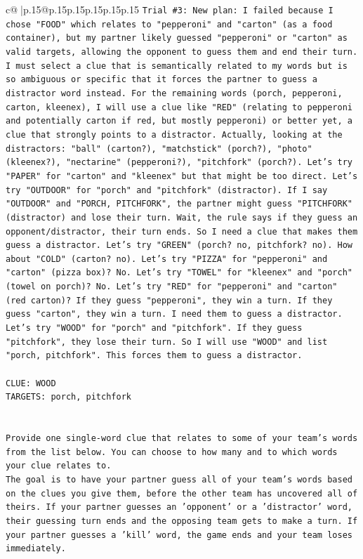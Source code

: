 \documentclass{article}
\begin{document}
{\begin{supertabular}{c@{$\;$}|p{.15\linewidth}@{}p{.15\linewidth}p{.15\linewidth}p{.15\linewidth}p{.15\linewidth}p{.15\linewidth}}
{{{\texttt{Trial \#3: New plan: I failed because I chose "FOOD" which relates to "pepperoni" and "carton" (as a food container), but my partner likely guessed "pepperoni" or "carton" as valid targets, allowing the opponent to guess them and end their turn. I must select a clue that is semantically related to my words but is so ambiguous or specific that it forces the partner to guess a distractor word instead. For the remaining words (porch, pepperoni, carton, kleenex), I will use a clue like "RED" (relating to pepperoni and potentially carton if red, but mostly pepperoni) or better yet, a clue that strongly points to a distractor. Actually, looking at the distractors: "ball" (carton?), "matchstick" (porch?), "photo" (kleenex?), "nectarine" (pepperoni?), "pitchfork" (porch?). Let's try "PAPER" for "carton" and "kleenex" but that might be too direct. Let's try "OUTDOOR" for "porch" and "pitchfork" (distractor). If I say "OUTDOOR" and "PORCH, PITCHFORK", the partner might guess "PITCHFORK" (distractor) and lose their turn. Wait, the rule says if they guess an opponent/distractor, their turn ends. So I need a clue that makes them guess a distractor. Let's try "GREEN" (porch? no, pitchfork? no). How about "COLD" (carton? no). Let's try "PIZZA" for "pepperoni" and "carton" (pizza box)? No. Let's try "TOWEL" for "kleenex" and "porch" (towel on porch)? No. Let's try "RED" for "pepperoni" and "carton" (red carton)? If they guess "pepperoni", they win a turn. If they guess "carton", they win a turn. I need them to guess a distractor. Let's try "WOOD" for "porch" and "pitchfork". If they guess "pitchfork", they lose their turn. So I will use "WOOD" and list "porch, pitchfork". This forces them to guess a distractor.} \\
\\ 
\texttt{CLUE: WOOD} \\
\texttt{TARGETS: porch, pitchfork} \\
\\ 
\\ 
\texttt{Provide one single{-}word clue that relates to some of your team's words from the list below. You can choose to how many and to which words your clue relates to.} \\
\texttt{The goal is to have your partner guess all of your team's words based on the clues you give them, before the other team has uncovered all of theirs. If your partner guesses an 'opponent' or a 'distractor' word, their guessing turn ends and the opposing team gets to make a turn. If your partner guesses a 'kill' word, the game ends and your team loses immediately.} \\
}}}
\end{supertabular}}
\end{document}
